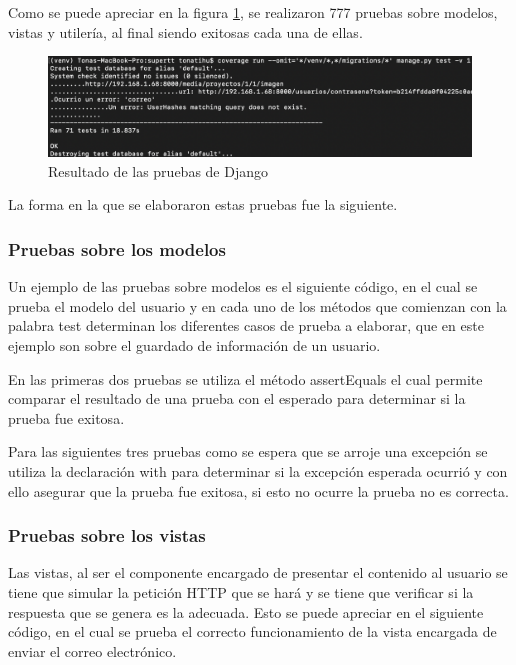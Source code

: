 Como se puede apreciar en la figura \ref{fig:pruebasDjango}, se realizaron 777 pruebas sobre modelos, vistas y utilería, al final siendo exitosas cada una de ellas.

\begin{figure}[H]
	\centering
	\includegraphics[width=450px]{capitulo6/unitarias/img/pruebasDjango.png}
	\caption{Resultado de las pruebas de Django}
	\label{fig:pruebasDjango}
\end{figure}

La forma en la que se elaboraron estas pruebas fue la siguiente.

\subsubsection{Pruebas sobre los modelos}

Un ejemplo de las pruebas sobre modelos es el siguiente código, en el cual se prueba el modelo del usuario y en cada uno de los métodos que comienzan con la palabra test determinan los diferentes casos de prueba a elaborar, que en este ejemplo son sobre el guardado de información de un usuario.



En las primeras dos pruebas se utiliza el método assertEquals el cual permite comparar el resultado de una prueba con el esperado para determinar si la prueba fue exitosa.

Para las siguientes tres pruebas como se espera que se arroje una excepción se utiliza la declaración with para determinar si la excepción esperada ocurrió y con ello asegurar que la prueba fue exitosa, si esto no ocurre la prueba no es correcta. 

\subsubsection{Pruebas sobre los vistas}

Las vistas, al ser el componente encargado de presentar el contenido al usuario se tiene que simular la petición HTTP que se hará y se tiene que verificar si la respuesta que se genera es la adecuada. Esto se puede apreciar en el siguiente código, en el cual se prueba el correcto funcionamiento de la vista encargada de enviar el correo electrónico.

